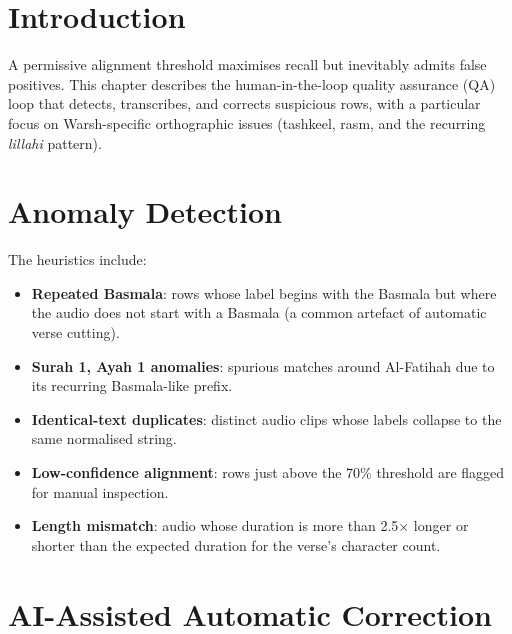 \section{Introduction}
A permissive alignment threshold maximises recall but inevitably admits
false positives. This chapter describes the human-in-the-loop quality
assurance (QA) loop that detects, transcribes, and corrects suspicious
rows, with a particular focus on Warsh-specific orthographic issues
(tashkeel, rasm, and the recurring \emph{lillahi} pattern).

\section{Anomaly Detection}


The heuristics include:
\begin{itemize}
  \item \textbf{Repeated Basmala}: rows whose label begins with the
        Basmala but where the audio does not start with a Basmala (a
        common artefact of automatic verse cutting).
  \item \textbf{Surah 1, Ayah 1 anomalies}: spurious matches around
        Al-Fatihah due to its recurring Basmala-like prefix.
  \item \textbf{Identical-text duplicates}: distinct audio clips whose
        labels collapse to the same normalised string.
  \item \textbf{Low-confidence alignment}: rows just above the 70\%
        threshold are flagged for manual inspection.
  \item \textbf{Length mismatch}: audio whose duration is more than
        2.5$\times$ longer or shorter than the expected duration for the
        verse's character count.
\end{itemize}

\section{AI-Assisted Automatic Correction}


